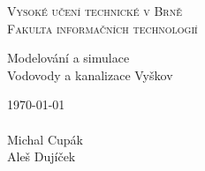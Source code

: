 

\begin{titlepage}

\begin{center}
  
		{\Huge  {\scshape Vysoké učení technické v Brně}\\}
		{\huge {\scshape Fakulta informačních technologií}\\}
	
		
	{\LARGE Modelování a simulace}
	\\
	\medskip
	{\Huge Vodovody a kanalizace Vyškov}\\
\end{center}
{\Large \today \\\\ Michal Cupák \\ Aleš Dujíček}


\end{titlepage}
